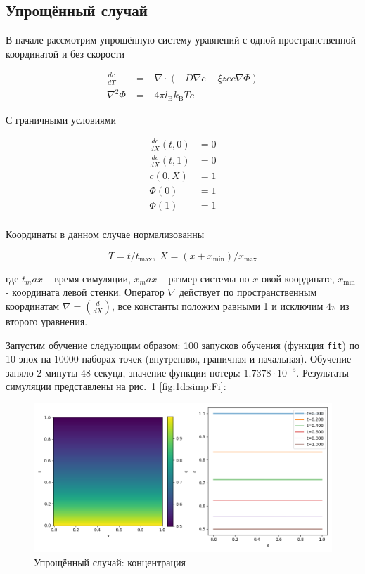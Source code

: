 \documentclass[a4paper,14pt]{extarticle} %
\begin{document}
\subsection{Упрощённый случай}

В начале рассмотрим упрощённую систему уравнений с одной пространственной координатой и без скорости

$$
    \begin{aligned}
        \frac{dc}{dT} & = -\nabla \cdot (- D\nabla c - \xi z e c \nabla \Phi) \\
        \nabla^2 \Phi & = -4 \pi l_\mathrm{B} k_\mathrm{B}T c
    \end{aligned}
$$

С граничными условиями

$$
    \begin{aligned}
        \frac{dc}{dX}(t, 0) & = 0 \\
        \frac{dc}{dX}(t, 1) & = 0 \\
        c(0, X)             & = 1 \\
        \Phi(0)             & = 1 \\
        \Phi(1)             & = 1 \\
    \end{aligned}
$$

Координаты в данном случае нормализованны

$$T = t/t_{\max},\;  X = (x+x_{\min})/x_{\max}$$

где $t_max$ -- время симуляции, $x_max$ -- размер системы по $x$-овой координате, $x_{\min}$ - координата левой стенки. Оператор $\nabla$ действует по пространственным координатам $\nabla = (\frac{d}{d X})$, все константы положим равными 1 и исключим $4\pi$ из второго уравнения.

Запустим обучение следующим образом: 100 запусков обучения (функция \texttt{fit}) по 10 эпох на 10000 наборах точек (внутренняя, граничная и начальная). Обучение заняло 2 минуты 48 секунд, значение функции потерь: $1.7378\cdot 10^{-5}$. Результаты симуляции представлены на рис.~\ref{fig:1d:simp:c} \ref{fig:1d:simp:Fi}:

\begin{figure}[ht]
    \includegraphics[width=\textwidth]{../plots/1-dim c simpified tanh 80,20.png}
    \caption{Упрощённый случай: концентрация}
    \label{fig:1d:simp:c}
\end{figure}
\end{document}
